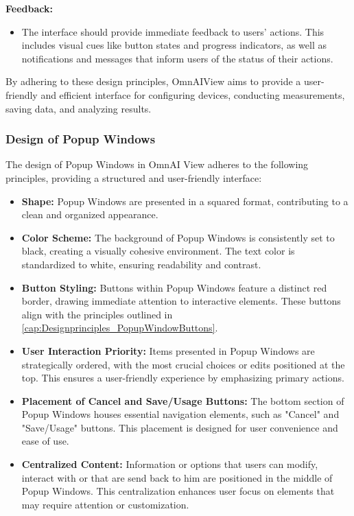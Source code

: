 \documentclass[]{scrreprt}
\begin{document}
\textbf{Feedback:}
    \begin{itemize}
        \item The interface should provide immediate feedback to users' actions. This includes visual cues like button states and progress indicators, as well as notifications and messages that inform users of the status of their actions.
    \end{itemize}
    
By adhering to these design principles, OmnAIView aims to provide a user-friendly and efficient interface for configuring devices, conducting measurements, saving data, and analyzing results.
    
\subsubsection{Design of Popup Windows}

The design of Popup Windows in OmnAI View adheres to the following principles, providing a structured and user-friendly interface:

\begin{itemize}
    \item \textbf{Shape:} Popup Windows are presented in a squared format, contributing to a clean and organized appearance.
    
    \item \textbf{Color Scheme:} The background of Popup Windows is consistently set to black, creating a visually cohesive environment. The text color is standardized to white, ensuring readability and contrast.
    
    \item \textbf{Button Styling:} Buttons within Popup Windows feature a distinct red border, drawing immediate attention to interactive elements. These buttons align with the principles outlined in \ref{cap:Designprinciples_PopupWindowButtons}.
    
    \item \textbf{User Interaction Priority:} Items presented in Popup Windows are strategically ordered, with the most crucial choices or edits positioned at the top. This ensures a user-friendly experience by emphasizing primary actions.
    
    \item \textbf{Placement of Cancel and Save/Usage Buttons:} The bottom section of Popup Windows houses essential navigation elements, such as "Cancel" and "Save/Usage" buttons. This placement is designed for user convenience and ease of use.
    
    \item \textbf{Centralized Content:} Information or options that users can modify, interact with or that are send back to him are positioned in the middle of Popup Windows. This centralization enhances user focus on elements that may require attention or customization.
\end{itemize}
\end{document}
